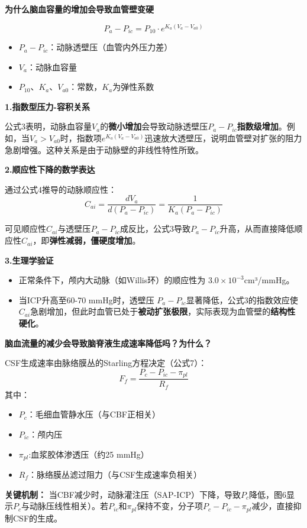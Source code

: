 \documentclass[12pt]{article}
\begin{document}
\noindent \textbf{\large 为什么脑血容量的增加会导致血管壁变硬}
\vspace{0.25cm}

\[P_a - P_{ic} = P_{10} \cdot e^{K_a (V_a - V_{a0})}\]

\begin{itemize}
    \item $P_a - P_{ic}$：动脉透壁压（血管内外压力差）
    \item $V_a$：动脉血容量
    \item $P_{10}$、$K_a$、$V_{a0}$：常数，$K_a$为弹性系数
\end{itemize}

\noindent \textbf{1.指数型压力-容积关系}

公式3表明，动脉血容量$V_a$的\textbf{微小增加}会导致动脉透壁压$P_a - P_{ic}$\textbf{指数级增加}。例如，当$V_a > V_{a0}$时，指数项$e^{K_a(V_a - V_{a0})}$迅速放大透壁压，说明血管壁对扩张的阻力急剧增强。这种关系是由于动脉壁的非线性特性所致。

\noindent \textbf{2.顺应性下降的数学表达}

通过公式4推导的动脉顺应性：\[C_{ai} = \frac{dV_a}{d(P_a - P_{ic})} = \frac{1}{K_a(P_a - P_{ic})}\]

可见顺应性$C_{ai}$与透壁压$P_a - P_{ic}$成反比，公式3导致$P_a - P_{ic}$升高，从而直接降低顺应性$C_{ai}$，即\textbf{弹性减弱，僵硬度增加}。

\noindent \textbf{3.生理学验证}

\begin{itemize}
    \item 正常条件下，颅内大动脉（如Willis环）的顺应性为 $3.0 \times 10^{-3}$cm³/mmHg。
    \item 当ICP升高至60-70 mmHg时，透壁压 $P_a - P_{ic}$显著降低，公式3的指数效应使$C_{ai}$急剧增加，但此时血管已处于\textbf{被动扩张极限}，实际表现为血管壁的\textbf{结构性硬化}。
\end{itemize}


\noindent \textbf{\large 脑血流量的减少会导致脑脊液生成速率降低吗？为什么？}
\vspace{0.25cm}


CSF生成速率由脉络膜丛的Starling方程决定（公式7）：\[F_f = \frac{P_c - P_{ic} - \pi_{pl}}{R_f}\]
其中：
\begin{itemize}
    \item $P_c$：毛细血管静水压（与CBF正相关）
    \item $P_{ic}$：颅内压
    \item $ \pi_{pl}$:血浆胶体渗透压（约25 mmHg）
    \item $R_f$：脉络膜丛滤过阻力（与CSF生成速率负相关）
\end{itemize}
\textbf{关键机制：}
当CBF减少时，动脉灌注压（SAP-ICP）下降，导致$P_c$降低，图6显示$P_c$与动脉压线性相关）。若$P_{ic}$和$\pi_{pl}$保持不变，分子项$P_c - P_{ic} - \pi_{pl}$减少，直接抑制CSF的生成。
\vspace{0.25cm}
\end{document}

